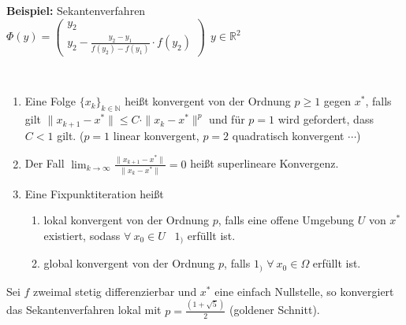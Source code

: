 \textbf{Beispiel:} Sekantenverfahren
\\\hspace*{8mm}$\Phi(y)=\begin{pmatrix} y_2 \\ y_2-\frac{y_2-y_1}{f(y_2)-f(y_1)}\cdot f(y_2)\end{pmatrix} \ \ y\in \mathbb{R}^2$\\
\newline

\begin{definition}[Konvergenzordnung]
~
\begin{enumerate}
\item Eine Folge $\{x_k \}_{k\in\mathbb{N}}$ heißt konvergent von der Ordnung $p\geq 1$ gegen $x^*$,
falls gilt $\| x_{k+1}-x^*\|\leq C\cdot \|x_k-x^*\|^p$ und für $p=1$ wird gefordert, dass $C<1$ gilt.
($p=1$ linear konvergent, $p=2$ quadratisch konvergent $\cdots$)
\item Der Fall $\lim_{k \to \infty}\frac{\|x_{k+1}-x^*\|}{\|x_k -x^*\|}=0$ heißt superlineare Konvergenz.
\item Eine Fixpunktiteration heißt
  \begin{enumerate}
  \item lokal konvergent von der Ordnung $p$, falls eine offene Umgebung $U$ von $x^*$ existiert,
        sodass $\forall \ x_0\in U$ \ $1_)$ erfüllt ist.
  \item global konvergent von der Ordnung $p$, falls $1_)$ $\forall \ x_0\in \Omega$ erfüllt ist.
  \end{enumerate}
\end{enumerate}
\end{definition}

\begin{lemma}
Sei $f$ zweimal stetig differenzierbar und $x^*$ eine einfach Nullstelle, so konvergiert das Sekantenverfahren lokal mit $p=\frac{(1+\sqrt{5})}{2}$ (goldener Schnitt).
\end{lemma}

